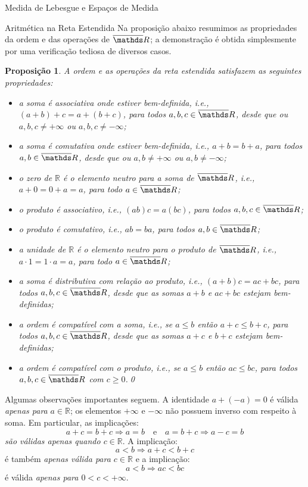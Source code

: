 \documentclass[oneside,final,11pt]{amsbook}
\newcommand{\R}{\mathds R}
\theoremstyle{remark}\newtheorem{exercise}{Exercício}[chapter]
\theoremstyle{remark}\newtheorem{*exercise}[exercise]{\hbox to 0pt{\hskip 0pt minus 1fil*}Exercício}
\theoremstyle{definition}\newtheorem{exdefin}{Definição}[chapter]
\theoremstyle{plain}\newtheorem{teo}{Teorema}[section]
\theoremstyle{plain}\newtheorem{lem}[teo]{Lema}
\theoremstyle{plain}\newtheorem{prop}[teo]{Proposição}
\theoremstyle{plain}\newtheorem{cor}[teo]{Corolário}
\theoremstyle{definition}\newtheorem{defin}[teo]{Definição}
\theoremstyle{remark}\newtheorem{rem}[teo]{Observação}
\theoremstyle{definition}\newtheorem{notation}[teo]{Notação}
\theoremstyle{definition}\newtheorem{convention}[teo]{Convenção}
\theoremstyle{definition}\newtheorem{example}[teo]{Exemplo}
\numberwithin{section}{chapter}
\numberwithin{equation}{section}
\begin{document}
\begin{chapter}{Medida de Lebesgue e Espaços de Medida}
\begin{section}{Aritmética na Reta Estendida}
Na proposição abaixo resumimos as propriedades da ordem e das operações de $\overline\R$;
a demonstração é obtida simplesmente por uma verificação tediosa de diversos casos.
\begin{prop}
A ordem e as operações da reta estendida satisfazem as seguintes propriedades:
\begin{itemize}
\item a soma é associativa
onde estiver bem-definida, i.e., $(a+b)+c=a+(b+c)$, para todos
$a,b,c\in\overline\R$, desde que ou $a,b,c\ne+\infty$ ou $a,b,c\ne-\infty$;
\item a soma é comutativa
onde estiver bem-definida, i.e., $a+b=b+a$, para todos
$a,b\in\overline\R$, desde que ou $a,b\ne+\infty$ ou $a,b\ne-\infty$;
\item o zero de $\R$ é o elemento neutro
para a soma de $\overline\R$, i.e., $a+0=0+a=a$,
para todo $a\in\overline\R$;
\item o produto é associativo, i.e., $(ab)c=a(bc)$, para todos $a,b,c\in\overline\R$;
\item o produto é comutativo, i.e., $ab=ba$, para todos $a,b\in\overline\R$;
\item a unidade de $\R$ é o elemento neutro para o produto de $\overline\R$, i.e.,
$a\cdot1=1\cdot a=a$, para todo $a\in\overline\R$;
\item a soma é distributiva com relação ao produto, i.e., $(a+b)c=ac+bc$, para todos
$a,b,c\in\overline\R$, desde que as somas $a+b$ e $ac+bc$ estejam bem-definidas;
\item a ordem é compatível com a soma, i.e., se $a\le b$ então $a+c\le b+c$,
para todos $a,b,c\in\overline\R$, desde que as somas $a+c$ e $b+c$ estejam bem-definidas;
\item a ordem é compatível com o produto, i.e., se $a\le b$ então $ac\le bc$, para todos
$a,b,c\in\overline\R$ com $c\ge0$.\qed
\end{itemize}
\end{prop}

Algumas observações importantes seguem. A identidade $a+(-a)=0$ é válida {\em apenas para\/}
$a\in\R$; os elementos $+\infty$ e $-\infty$ não possuem inverso com respeito à soma.
Em particular, as implicações:
\[a+c=b+c\Longrightarrow a=b\quad\text{e}\quad a=b+c\Longrightarrow a-c=b\]
{\em são válidas apenas quando $c\in\R$}.
A implicação:
\[a<b\Longrightarrow a+c<b+c\]
é também {\em apenas válida para $c\in\R$} e a implicação:
\[a<b\Longrightarrow ac<bc\]
é válida {\em apenas para $0<c<+\infty$}.


\end{section}
\end{chapter}
\end{document}
